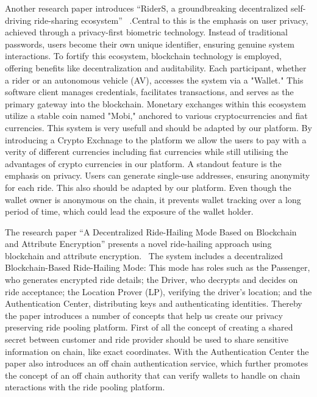 Another research paper introduces ``RiderS, a groundbreaking decentralized self-driving ride-sharing ecosystem'' ~\cite{Bathen.}.Central to this is the emphasis on user privacy, achieved through a privacy-first biometric technology. Instead of traditional passwords, users become their own unique identifier, ensuring genuine system interactions. To fortify this ecosystem, blockchain technology is employed, offering benefits like decentralization and auditability. Each participant, whether a rider or an autonomous vehicle (AV), accesses the system via a "Wallet." This software client manages credentials, facilitates transactions, and serves as the primary gateway into the blockchain. Monetary exchanges within this ecosystem utilize a stable coin named "Mobi," anchored to various cryptocurrencies and fiat currencies. This system is very usefull and should be adapted by our platform. By introducing a Crypto Exchnage to the platform we allow the users to pay with a verity of different currencies including fiat currencies while still utilising the advantages of crypto currencies   in our platform. A standout feature is the emphasis on privacy. Users can generate single-use addresses, ensuring anonymity for each ride. This also should be adapted by our platform. Even though the wallet owner is anonymous on the chain, it prevents wallet tracking over a long period of time, which could lead the exposure of the wallet holder.

The research paper ``A Decentralized Ride-Hailing Mode Based on Blockchain and Attribute Encryption'' presents a novel ride-hailing approach using blockchain and attribute encryption.~\cite{Zhang.} 
The system includes a decentralized Blockchain-Based Ride-Hailing Mode: This mode has roles such as the Passenger, who generates encrypted ride details; the Driver, who decrypts and decides on ride acceptance; the Location Prover (LP), verifying the driver's location; and the Authentication Center, distributing keys and authenticating identities. Thereby the paper introduces a number of concepts that help us create our privacy preserving ride pooling platform. First of all the concept of creating a shared secret between customer and ride provider should be used  to share sensitive information on chain, like exact coordinates. With the  Authentication Center the paper also introduces an off chain authentication service, which further promotes the concept of an off chain authority that can verify  wallets to handle on chain nteractions with the ride pooling platform.

